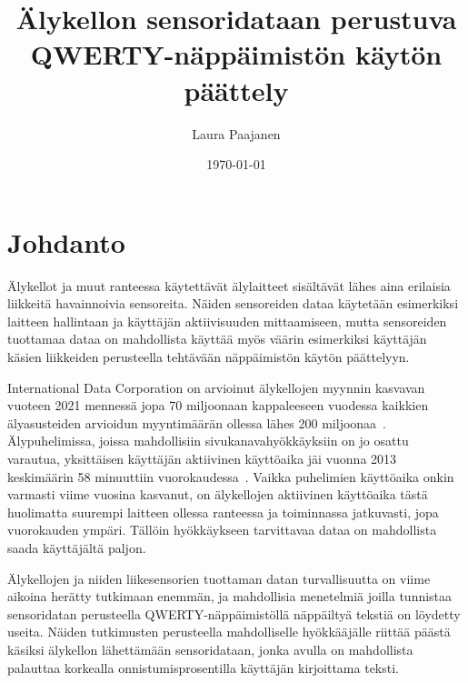 \documentclass[finnish]{tktltiki2}
\title{Älykellon sensoridataan perustuva QWERTY-näppäimistön käytön päättely}
\author{Laura Paajanen}
\date{\today}
\theoremstyle{definition}
\theoremstyle{remark}
\begin{document}

\frontmatter      %

\maketitle        %
\makeabstract     %

\tableofcontents  %


\mainmatter       %

\section{Johdanto}
Älykellot ja muut ranteessa käytettävät älylaitteet sisältävät lähes aina erilaisia liikkeitä havainnoivia sensoreita. Näiden sensoreiden dataa käytetään esimerkiksi laitteen hallintaan ja käyttäjän aktiivisuuden mittaamiseen, mutta sensoreiden tuottamaa dataa on mahdollista käyttää myös väärin esimerkiksi käyttäjän käsien liikkeiden perusteella tehtävään näppäimistön käytön päättelyyn. 

International Data Corporation on arvioinut älykellojen myynnin kasvavan vuoteen 2021 mennessä jopa 70 miljoonaan kappaleeseen vuodessa kaikkien älyasusteiden arvioidun myyntimäärän ollessa lähes 200 miljoonaa~\cite{bi}. Älypuhelimissa, joissa mahdollisiin sivukanavahyökkäyksiin on jo osattu varautua, yksittäisen käyttäjän aktiivinen käyttöaika jäi vuonna 2013 keskimäärin 58 minuuttiin vuorokaudessa~\cite{john}. Vaikka puhelimien käyttöaika onkin varmasti viime vuosina kasvanut,  on älykellojen aktiivinen käyttöaika tästä huolimatta suurempi laitteen ollessa ranteessa ja toiminnassa jatkuvasti, jopa vuorokauden ympäri. Tällöin hyökkäykseen tarvittavaa dataa on mahdollista saada käyttäjältä paljon. 

Älykellojen ja niiden liikesensorien tuottaman datan turvallisuutta on viime aikoina herätty tutkimaan enemmän, ja mahdollisia menetelmiä joilla tunnistaa sensoridatan perusteella QWERTY-näppäimistöllä näppäiltyä tekstiä on löydetty useita. Näiden tutkimusten perusteella mahdolliselle hyökkääjälle riittää päästä käsiksi älykellon lähettämään sensoridataan, jonka avulla on mahdollista palauttaa korkealla onnistumisprosentilla käyttäjän kirjoittama teksti.
\end{document}
